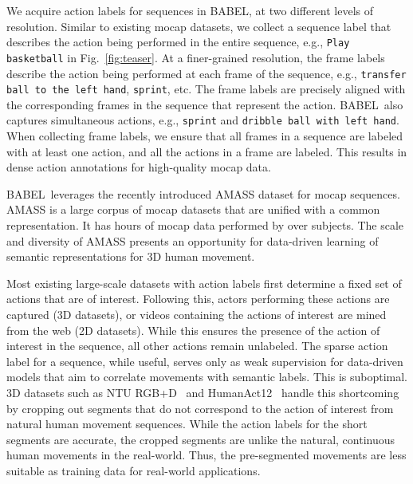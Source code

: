 \documentclass[final]{cvpr}
\def\babel{BABEL}
\def\ntu{NTU RGB+D}
\def\ha12{HumanAct12}
\begin{document}
We acquire action labels for sequences in \babel, at two different levels of resolution. 
Similar to existing mocap datasets, we collect a sequence label that describes the action being performed in the entire sequence, e.g., \texttt{Play basketball} in Fig.~\ref{fig:teaser}. 
At a finer-grained resolution, the frame labels describe the action being performed at each frame of the sequence, e.g., \texttt{transfer ball to the left hand}, \texttt{sprint}, etc. 
The frame labels are precisely aligned with the corresponding frames in the sequence that represent the action. 
\babel~also captures simultaneous actions, e.g., \texttt{sprint} and \texttt{dribble ball with left hand}. 
When collecting frame labels, we ensure that all frames in a sequence are labeled with at least one action, and all the actions in a frame are labeled. This results in dense action annotations for high-quality mocap data. 

\babel~leverages the recently introduced AMASS dataset \cite{DBLP:conf/iccv/MahmoodGTPB19} for mocap sequences. AMASS is a large corpus of mocap datasets that are unified with a common representation. 
It has  hours of mocap data performed by over  subjects. 
The scale and diversity of AMASS presents an opportunity for data-driven learning of semantic representations for 3D human movement. 

Most existing large-scale datasets with action labels \cite{cmu_mocap,harvey2020robust,DBLP:journals/pami/LiuSPWDK20,DBLP:conf/icar/ManderyTDVA15,DBLP:conf/mir/SedmidubskyEZ19,DBLP:conf/cvpr/ShahroudyLNW16,DBLP:conf/iccv/Zhao0TY19,DBLP:journals/corr/abs-2004-14899} first determine a fixed set of actions that are of interest. 
Following this, actors performing these actions are captured (3D datasets), or videos containing the actions of interest are mined from the web (2D datasets). 
While this ensures the presence of the action of interest in the sequence, all other actions remain unlabeled. 
The sparse action label for a sequence, while useful, serves only as weak supervision for data-driven models that aim to correlate movements with semantic labels. This is suboptimal. 
3D datasets such as \ntu~\cite{DBLP:journals/pami/LiuSPWDK20,DBLP:conf/cvpr/ShahroudyLNW16} and \ha12~\cite{DBLP:journals/corr/abs-2004-14899} handle this shortcoming by cropping out segments that do not correspond to the action of interest from natural human movement sequences. 
While the action labels for the short segments are accurate, the cropped segments are unlike the natural, continuous human movements in the real-world. Thus, the pre-segmented movements are less suitable as training data for real-world applications. 
\end{document}
